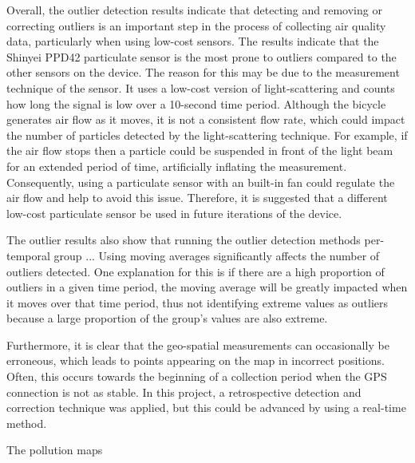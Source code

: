 \documentclass[11pt]{report}
\begin{document}
Overall, the outlier detection results indicate that detecting and removing or correcting outliers is an important step in the process of collecting air quality data, particularly when using low-cost sensors. The results indicate that the Shinyei PPD42 particulate sensor is the most prone to outliers compared to the other sensors on the device. The reason for this may be due to the measurement technique of the sensor. It uses a low-cost version of light-scattering and counts how long the signal is low over a 10-second time period. Although the bicycle generates air flow as it moves, it is not a consistent flow rate, which could impact the number of particles detected by the light-scattering technique. For example, if the air flow stops then a particle could be suspended in front of the light beam for an extended period of time, artificially inflating the measurement. Consequently, using a particulate sensor with an built-in fan could regulate the air flow and help to avoid this issue. Therefore, it is suggested that a different low-cost particulate sensor be used in future iterations of the device.

The outlier results also show that running the outlier detection methods per-temporal group ... Using moving averages significantly affects the number of outliers detected. One explanation for this is if there are a high proportion of outliers in a given time period, the moving average will be greatly impacted when it moves over that time period, thus not identifying extreme values as outliers because a large proportion of the group's values are also extreme.

Furthermore, it is clear that the geo-spatial measurements can occasionally be erroneous, which leads to points appearing on the map in incorrect positions. Often, this occurs towards the beginning of a collection period when the GPS connection is not as stable. In this project, a retrospective detection and correction technique was applied, but this could be advanced by using a real-time method. 

The pollution maps
\end{document}
